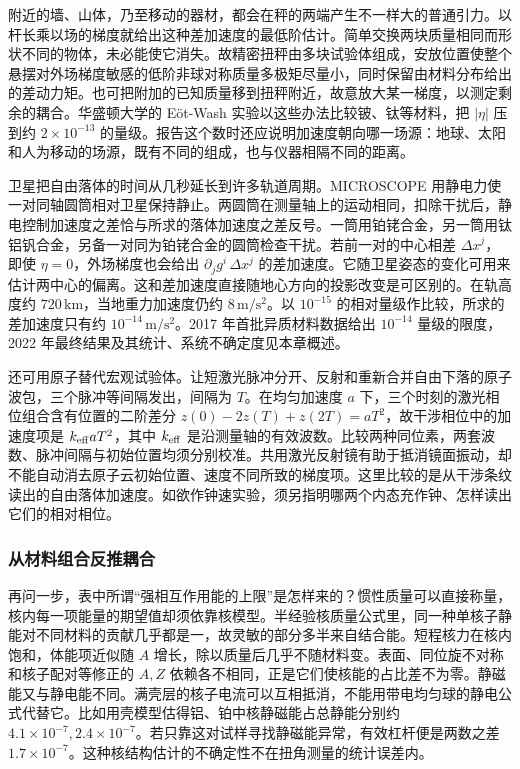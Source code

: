 附近的墙、山体，乃至移动的器材，都会在秤的两端产生不一样大的普通引力。以杆长乘以场的梯度就给出这种差加速度的最低阶估计。简单交换两块质量相同而形状不同的物体，未必能使它消失。故精密扭秤由多块试验体组成，安放位置使整个悬摆对外场梯度敏感的低阶非球对称质量多极矩尽量小，同时保留由材料分布给出的差动力矩。也可把附加的已知质量移到扭秤附近，故意放大某一梯度，以测定剩余的耦合。华盛顿大学的 Eöt-Wash 实验以这些办法比较铍、钛等材料，把 $|\eta|$ 压到约 $2\times10^{-13}$ 的量级。报告这个数时还应说明加速度朝向哪一场源：地球、太阳和人为移动的场源，既有不同的组成，也与仪器相隔不同的距离。

卫星把自由落体的时间从几秒延长到许多轨道周期。MICROSCOPE 用静电力使一对同轴圆筒相对卫星保持静止。两圆筒在测量轴上的运动相同，扣除干扰后，静电控制加速度之差恰与所求的落体加速度之差反号。一筒用铂铑合金，另一筒用钛铝钒合金，另备一对同为铂铑合金的圆筒检查干扰。若前一对的中心相差 $\Delta x^j$，即使 $\eta=0$，外场梯度也会给出 $\partial_jg^i\,\Delta x^j$ 的差加速度。它随卫星姿态的变化可用来估计两中心的偏离。这和差加速度直接随地心方向的投影改变是可区别的。在轨高度约 $720\,\mathrm{km}$，当地重力加速度仍约 $8\,\mathrm{m/s^2}$。以 $10^{-15}$ 的相对量级作比较，所求的差加速度只有约 $10^{-14}\,\mathrm{m/s^2}$。2017 年首批异质材料数据给出 $10^{-14}$ 量级的限度，2022 年最终结果及其统计、系统不确定度见本章概述。

还可用原子替代宏观试验体。让短激光脉冲分开、反射和重新合并自由下落的原子波包，三个脉冲等间隔发出，间隔为 $T$。在均匀加速度 $a$ 下，三个时刻的激光相位组合含有位置的二阶差分 $z(0)-2z(T)+z(2T)=aT^2$，故干涉相位中的加速度项是 $k_{\rm eff}aT^2$，其中 $k_{\rm eff}$ 是沿测量轴的有效波数。比较两种同位素，两套波数、脉冲间隔与初始位置均须分别校准。共用激光反射镜有助于抵消镜面振动，却不能自动消去原子云初始位置、速度不同所致的梯度项。这里比较的是从干涉条纹读出的自由落体加速度。如欲作钟速实验，须另指明哪两个内态充作钟、怎样读出它们的相对相位。

\subsubsection{从材料组合反推耦合}

再问一步，表中所谓“强相互作用能的上限”是怎样来的？惯性质量可以直接称量，核内每一项能量的期望值却须依靠核模型。半经验核质量公式里，同一种单核子静能对不同材料的贡献几乎都是一，故灵敏的部分多半来自结合能。短程核力在核内饱和，体能项近似随 $A$ 增长，除以质量后几乎不随材料变。表面、同位旋不对称和核子配对等修正的 $A,Z$ 依赖各不相同，正是它们使核能的占比差不为零。静磁能又与静电能不同。满壳层的核子电流可以互相抵消，不能用带电均匀球的静电公式代替它。比如用壳模型估得铝、铂中核静磁能占总静能分别约 $4.1\times10^{-7},2.4\times10^{-7}$。若只靠这对试样寻找静磁能异常，有效杠杆便是两数之差 $1.7\times10^{-7}$。这种核结构估计的不确定性不在扭角测量的统计误差内。

